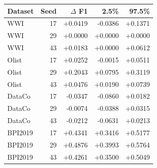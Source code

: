 \begin{tabular}{lrrrr}
\toprule
Dataset & Seed & $\Delta$ F1 & 2.5\% & 97.5\% \\
\midrule
WWI & 17 & +0.0419 & -0.0386 & +0.1371 \\
WWI & 29 & +0.0000 & +0.0000 & +0.0000 \\
WWI & 43 & +0.0183 & +0.0000 & +0.0612 \\
Olist & 17 & +0.0252 & -0.0015 & +0.0511 \\
Olist & 29 & +0.2043 & +0.0795 & +0.3119 \\
Olist & 43 & +0.0476 & +0.0190 & +0.0739 \\
DataCo & 17 & -0.0347 & -0.0860 & +0.0182 \\
DataCo & 29 & -0.0074 & -0.0388 & +0.0315 \\
DataCo & 43 & -0.0212 & -0.0631 & +0.0213 \\
BPI2019 & 17 & +0.4341 & +0.3416 & +0.5177 \\
BPI2019 & 29 & +0.4876 & +0.3993 & +0.5764 \\
BPI2019 & 43 & +0.4261 & +0.3500 & +0.5049 \\
\bottomrule
\end{tabular}
